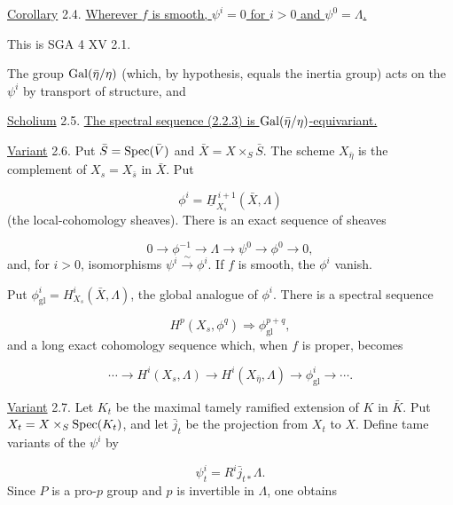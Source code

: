 \underline{Corollary} 2.4. \underline{Wherever $f$ is smooth, $\psi^i=0$ for $i>0$ and $\psi^0=\Lambda$.}

This is SGA 4 XV 2.1.

The group $\operatorname{Gal}(\bar\eta/\eta)$ (which, by hypothesis, equals the inertia group) acts on the $\psi^i$ by transport of structure, and

\underline{Scholium} 2.5. \underline{The spectral sequence (2.2.3) is $\operatorname{Gal}(\bar\eta/\eta)$-equivariant.}

\underline{Variant} 2.6. Put $\bar S=\operatorname{Spec}(\bar V)$ and $\bar X=X\times_S\bar S$. The scheme $X_{\bar\eta}$ is the complement of $X_s=X_{\bar s}$ in $\bar X$. Put

\begin{equation*}
\phi^i=\underline{H}^{\,i+1}_{X_s}(\bar X,\Lambda)
\end{equation*}
(the local-cohomology sheaves). There is an exact sequence of sheaves

\begin{equation*}
0\longrightarrow\phi^{-1}\longrightarrow\Lambda\longrightarrow\psi^0
\longrightarrow\phi^0\longrightarrow0,
\end{equation*}
and, for $i>0$, isomorphisms $\psi^i\xrightarrow{\ \sim\ }\phi^i$. If $f$ is smooth, the $\phi^i$ vanish.

Put $\phi^i_{\mathrm{gl}}=H^i_{X_s}(\bar X,\Lambda)$, the global analogue of $\phi^i$. There is a spectral sequence

\begin{equation*}\tag{2.6.1}
H^p(X_s,\phi^q)\Longrightarrow\phi^{p+q}_{\mathrm{gl}},
\end{equation*}
and a long exact cohomology sequence which, when $f$ is proper, becomes

\begin{equation*}\tag{2.6.2}
\cdots\longrightarrow H^i(X_s,\Lambda)\longrightarrow H^i(X_{\bar\eta},\Lambda)
\longrightarrow\phi^i_{\mathrm{gl}}\longrightarrow\cdots.
\end{equation*}

\underline{Variant} 2.7. Let $K_t$ be the maximal tamely ramified extension of $K$ in $\bar K$. Put $X_t=X\times_S\operatorname{Spec}(K_t)$, and let $\bar j_t$ be the projection from $X_t$ to $X$. Define tame variants of the $\psi^i$ by


\begin{equation*}
\psi^i_t=R^i\bar j_{t*}\Lambda.
\end{equation*}
Since $P$ is a pro-$p$ group and $p$ is invertible in $\Lambda$, one obtains

